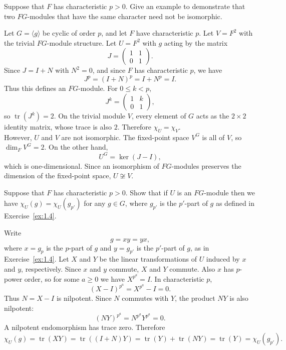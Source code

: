 \documentclass[../Odyssey_Project.tex]{subfiles}
\begin{document}
\begin{exercise}
\label{ex:14.7}
Suppose that $F$ has characteristic $p > 0$. Give an example to demonstrate that two $FG$-modules that have the same character need not be isomorphic.
\end{exercise}
\begin{solution}
    Let $G=\langle g\rangle$ be cyclic of order $p$, and let $F$ have characteristic $p$. Let $V=F^2$ with the trivial $FG$-module structure. Let $U=F^2$ with $g$ acting by the matrix
    \[
        J=
        \begin{pmatrix}
            1 & 1\\
            0 & 1
        \end{pmatrix}.
    \]
    Since $J=I+N$ with $N^2=0$, and since $F$ has characteristic $p$, we have
    \[
        J^p=(I+N)^p=I+N^p=I.
    \]
    Thus this defines an $FG$-module. For $0\leq k<p$,
    \[
        J^k=
        \begin{pmatrix}
            1 & k\\
            0 & 1
        \end{pmatrix},
    \]
    so $\operatorname{tr}(J^k)=2$. On the trivial module $V$, every element of $G$ acts as the $2\times2$ identity matrix, whose trace is also $2$. Therefore $\chi_U=\chi_V$.\\
    However, $U$ and $V$ are not isomorphic. The fixed-point space $V^G$ is all of $V$, so $\dim_F V^G=2$. On the other hand,
    \[
        U^G=\ker(J-I),
    \]
    which is one-dimensional. Since an isomorphism of $FG$-modules preserves the dimension of the fixed-point space, $U\not\cong V$.
\end{solution}

\begin{exercise}
\label{ex:14.8}
Suppose that $F$ has characteristic $p > 0$. Show that if $U$ is an $FG$-module then we have $\chi_U(g) = \chi_U(g_{p'})$ for any $g \in G$, where $g_{p'}$ is the $p'$-part of $g$ as defined in Exercise~\ref{ex:1.4}.
\end{exercise}
\begin{solution}
    Write
    \[
        g=xy=yx,
    \]
    where $x=g_p$ is the $p$-part of $g$ and $y=g_{p'}$ is the $p'$-part of $g$, as in Exercise~\ref{ex:1.4}. Let $X$ and $Y$ be the linear transformations of $U$ induced by $x$ and $y$, respectively. Since $x$ and $y$ commute, $X$ and $Y$ commute. Also $x$ has $p$-power order, so for some $a\geq0$ we have $X^{p^a}=I$. In characteristic $p$,
    \[
        (X-I)^{p^a}=X^{p^a}-I=0.
    \]
    Thus $N=X-I$ is nilpotent. Since $N$ commutes with $Y$, the product $NY$ is also nilpotent:
    \[
        (NY)^{p^a}=N^{p^a}Y^{p^a}=0.
    \]
    A nilpotent endomorphism has trace zero. Therefore
    \[
        \chi_U(g)
        =
        \operatorname{tr}(XY)
        =
        \operatorname{tr}((I+N)Y)
        =
        \operatorname{tr}(Y)+\operatorname{tr}(NY)
        =
        \operatorname{tr}(Y)
        =
        \chi_U(g_{p'}).
    \]
\end{solution}
\end{document}
